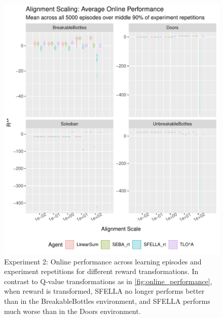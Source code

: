 \begin{figure}
  \includegraphics[width=\columnwidth]{output/multirun_n100_reward_to_util_transformonline_util_transform_Alignment.pdf}
  \caption{Experiment 2: Online performance across learning episodes and experiment repetitions for different reward transformations. In contrast to Q-value transformations as in \ref{fig:online_performance}, when reward is transformed, SFELLA no longer performs better than \tloA{} in the BreakableBottles environment, and SFELLA performs much worse than \tloA{} in the Doors environment.
  }
   \label{fig:online_performance_exp2}
 \end{figure}